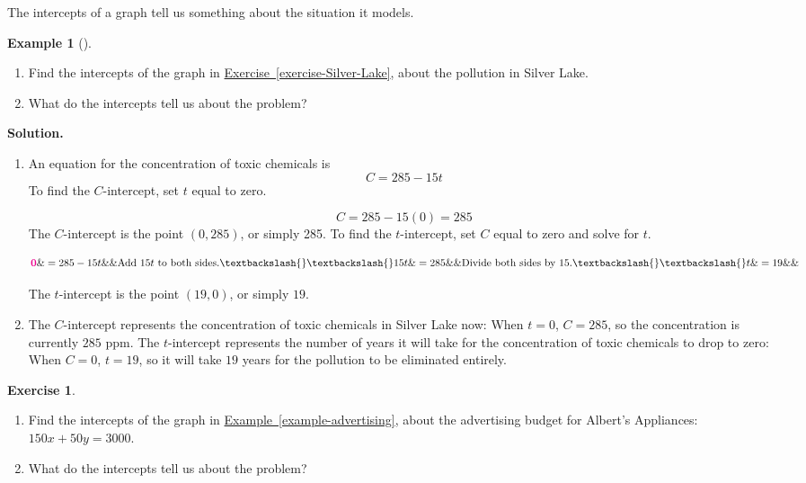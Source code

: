 \documentclass[10pt,]{book}
\theoremstyle{plain}
\theoremstyle{definition}
\theoremstyle{definition}
\newtheorem{example}[theorem]{Example}
\theoremstyle{definition}
\theoremstyle{definition}
\newtheorem{exercise}[theorem]{Exercise}
\numberwithin{equation}{section}
\newcommand{\alert}[1]{\mathbf{\color{magenta}{#1}}}
\begin{document}
      The intercepts of a graph tell us something about the situation it models.  
\begin{example}[]\label{example-intercepts}
\leavevmode%
\begin{enumerate}[label=*\alph**]
\item\hypertarget{li-54}{}
        Find the intercepts of the graph in \hyperref[exercise-Silver-Lake]{Exercise~\ref{exercise-Silver-Lake}}, about the pollution in Silver Lake.
    \item\hypertarget{li-55}{}What do the intercepts tell us about the problem?
    \end{enumerate}
\par\medskip\noindent%
\textbf{Solution.}\quad \leavevmode%
\begin{enumerate}[label=*\alph**]
\item\hypertarget{li-56}{}An equation for the concentration of toxic chemicals is \begin{equation*}C=285-15t\end{equation*} To find the \(C\)-intercept, set \(t\) equal to zero. 

            \begin{equation*}C=285-15(0)=285\end{equation*}
            The \(C\)-intercept is the point \((0, 285)\), or simply 285.  To find the \(t\)-intercept, set \(C\) equal to zero and solve for \(t\).
            
                \begin{align*}
                \alert{0}\&=285-15t \&\&\text{Add }15t \text{ to both sides.}\textbackslash{}\textbackslash{}
                15t\&=285  \&\&\text{Divide both sides by 15.}\textbackslash{}\textbackslash{}
                t\&=19   \&\& 
                \end{align*}


        The \(t\)-intercept is the point \((19,0)\), or simply \(19\).%
\item\hypertarget{li-57}{}The \(C\)-intercept represents the concentration of toxic chemicals in Silver Lake now:  When  \(t=0\), \(C=285\),  so the concentration is currently \(285\) ppm.  The \(t\)-intercept represents the number of years it will take for the concentration of toxic chemicals to drop to zero:  When \(C=0\), \(t=19\),  so it will take \(19\) years for the pollution to be eliminated entirely.%
\end{enumerate}
\end{example}
\begin{exercise}\label{exercise-6}
\leavevmode%
\begin{enumerate}[label=*\alph**]
\item\hypertarget{li-58}{}Find the intercepts of the graph in \hyperref[example-advertising]{Example~\ref{example-advertising}}, about the advertising budget for Albert’s Appliances: \(150x + 50y = 3000\).%
\item\hypertarget{li-59}{}What do the intercepts tell us about the problem?%
\end{enumerate}
\end{exercise}
\typeout{************************************************}
\typeout{************************************************}
\end{document}
